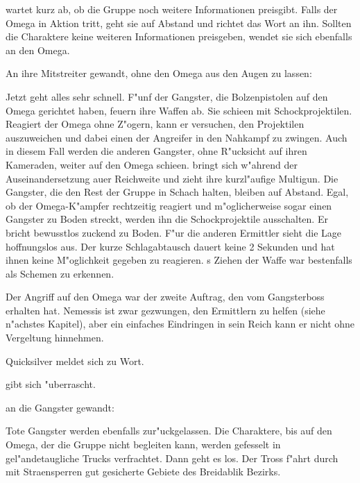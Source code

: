 \xl{} wartet kurz ab, ob die Gruppe noch weitere Informationen preisgibt. Falls der Omega in Aktion tritt, geht sie auf Abstand und richtet das Wort an ihn. Sollten die Charaktere keine weiteren Informationen preisgeben, wendet sie sich ebenfalls an den Omega.


An ihre Mitstreiter gewandt, ohne den Omega aus den Augen zu lassen:


Jetzt geht alles sehr schnell. F"unf der Gangster, die Bolzenpistolen auf den Omega gerichtet haben, feuern ihre Waffen ab. Sie schie\3en mit Schockprojektilen. Reagiert der Omega ohne Z"ogern, kann er versuchen, den Projektilen auszuweichen und dabei einen der Angreifer in den Nahkampf zu zwingen. Auch in diesem Fall werden die anderen Gangster, ohne R"ucksicht auf ihren Kameraden, weiter auf den Omega schie\3en. \xl{} bringt sich w"ahrend der Auseinandersetzung au\3er Reichweite und zieht ihre kurzl"aufige Multigun. Die Gangster, die den Rest der Gruppe in Schach halten, bleiben auf Abstand. Egal, ob der Omega-K"ampfer rechtzeitig reagiert und m"oglicherweise sogar einen Gangster zu Boden streckt, werden ihn die Schockprojektile ausschalten. Er bricht bewusstlos zuckend zu Boden. F"ur die anderen Ermittler sieht die Lage hoffnungslos aus. Der kurze Schlagabtausch dauert keine 2 Sekunden und hat ihnen keine M"oglichkeit gegeben zu reagieren. \xl{}s Ziehen der Waffe war bestenfalls als Schemen zu erkennen.

Der Angriff auf den Omega war der zweite Auftrag, den \xl{} vom Gangsterboss erhalten hat. Nemessis ist zwar gezwungen, den Ermittlern zu helfen (siehe n"achstes Kapitel), aber ein einfaches Eindringen in sein Reich kann er nicht ohne Vergeltung hinnehmen.

Quicksilver meldet sich zu Wort. 


\xl{} gibt sich "uberrascht. 


\xl{} an die Gangster gewandt: 


Tote Gangster werden ebenfalls zur"uckgelassen. Die Charaktere, bis auf den Omega, der die Gruppe nicht begleiten kann, werden gefesselt in gel"andetaugliche Trucks verfrachtet. Dann geht es los. Der Tross f"ahrt durch mit Stra\3ensperren gut gesicherte Gebiete des Breidablik Bezirks.

